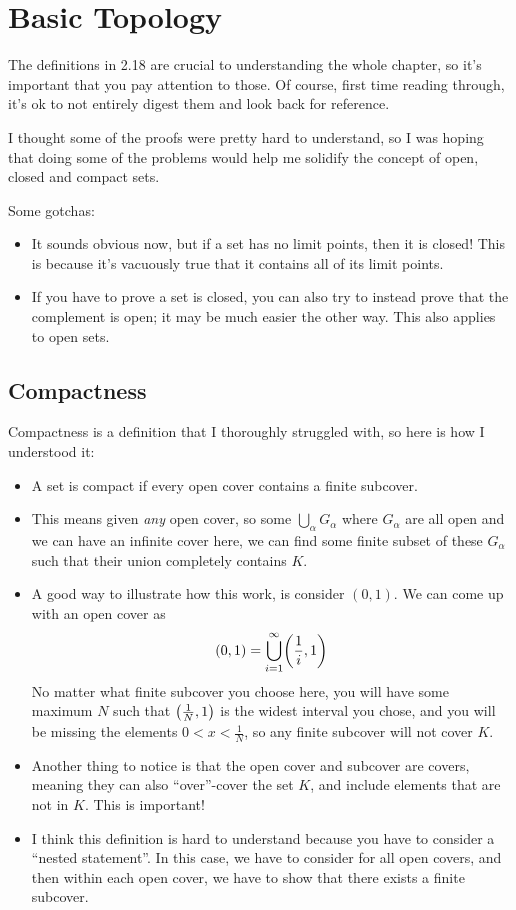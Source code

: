 \chapter{Basic Topology}

The definitions in 2.18 are crucial to understanding the whole chapter, so it's important that you pay attention to those. Of course, first time reading through, it's ok to not entirely digest them and look back for reference.

I thought some of the proofs were pretty hard to understand, so I was hoping that doing some of the problems would help me solidify the concept of open, closed and compact sets.

Some gotchas:
\begin{itemize}
  \item It sounds obvious now, but if a set has no limit points, then it is closed! This is because it's vacuously true that it contains all of its limit points.
  \item If you have to prove a set is closed, you can also try to instead prove that the complement is open; it may be much easier the other way. This also applies to open sets.
\end{itemize}

\section{Compactness}
\label{chap2:compactness}
Compactness is a definition that I thoroughly struggled with, so here is how I understood it:
\begin{itemize}
  \item A set is compact if every open cover contains a finite subcover.
  \item This means given \textit{any} open cover, so some $\bigcup_\alpha G_\alpha$ where $G_\alpha$ are all open and we can have an infinite cover here, we can find some finite subset of these $G_\alpha$ such that their union completely contains $K$.
  \item A good way to illustrate how this work, is consider $(0, 1)$. We can come up with an open cover as
        \begin{equation}
          (0, 1) = \bigcup_{i = 1}^\infty \pa{\frac{1}{i}, 1}
        \end{equation}
        No matter what finite subcover you choose here, you will have some maximum $N$ such that $\left(\frac{1}{N}, 1\right)$ is the widest interval you chose, and you will be missing the elements $0 < x < \frac{1}{N}$, so any finite subcover will not cover $K$.
  \item Another thing to notice is that the open cover and subcover are covers, meaning they can also ``over''-cover the set $K$, and include elements that are not in $K$. This is important!
  \item I think this definition is hard to understand because you have to consider a ``nested statement''. In this case, we have to consider for all open covers, and then within each open cover, we have to show that there exists a finite subcover.
\end{itemize}

